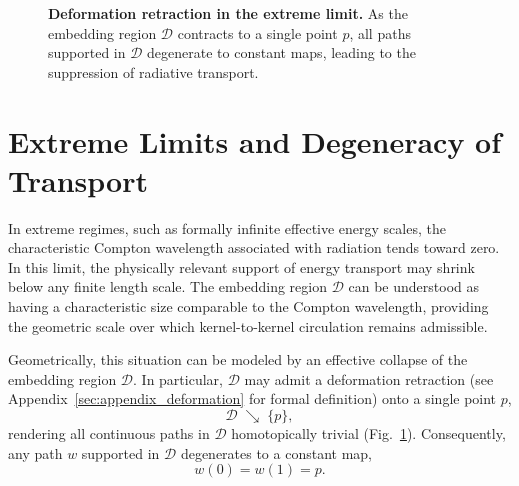 \documentclass[%
 reprint,
 amsmath,amssymb,
 aps,
 prb,
]{revtex4-2}
\numberwithin{equation}{section}
\begin{document}
\begin{figure}[t!]
\centering
{}
\caption{\justifying \textbf{Deformation retraction in the extreme limit.} As the embedding region $\mathcal{D}$ contracts to a single point $p$, all paths supported in $\mathcal{D}$ degenerate to constant maps, leading to the suppression of radiative transport.}
\label{fig:retraction}
\end{figure}


\section{Extreme Limits and Degeneracy of Transport}
\label{sec:extreme}

In extreme regimes, such as formally infinite effective energy scales, the characteristic Compton wavelength associated with radiation tends toward zero.
In this limit, the physically relevant support of energy transport may shrink below any finite length scale.
The embedding region $\mathcal{D}$ can be understood as having a characteristic size comparable to the Compton wavelength, providing the geometric scale over which kernel-to-kernel circulation remains admissible.

Geometrically, this situation can be modeled by an effective collapse of the embedding region $\mathcal{D}$.
In particular, $\mathcal{D}$ may admit a deformation retraction (see Appendix~\ref{sec:appendix_deformation} for formal definition) \cite{Munkres2000} onto a single point $p$,
\begin{equation}
\mathcal{D} \;\searrow\; \{p\},
\end{equation}
rendering all continuous paths in $\mathcal{D}$ homotopically trivial (Fig.~\ref{fig:retraction}).
Consequently, any path $w$ supported in $\mathcal{D}$ degenerates to a constant map,
\begin{equation}
w(0)=w(1)=p .
\end{equation}
\end{document}
